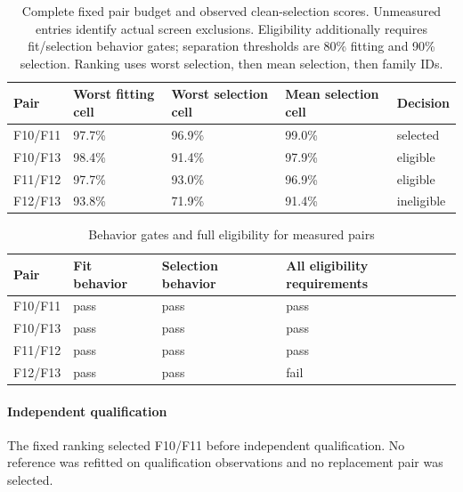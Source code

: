 \begin{table}[htbp]
\centering\footnotesize
\caption{Complete fixed pair budget and observed clean-selection scores. Unmeasured entries identify actual screen exclusions. Eligibility additionally requires fit/selection behavior gates; separation thresholds are 80\% fitting and 90\% selection. Ranking uses worst selection, then mean selection, then family IDs.}
\label{tab:b007-selection}
\begin{tabularx}{\linewidth}{@{}YYYYY@{}}
\toprule
Pair & Worst fitting cell & Worst selection cell & Mean selection cell & Decision \\
\midrule
F10/F11 & 97.7\% & 96.9\% & 99.0\% & selected \\
F10/F13 & 98.4\% & 91.4\% & 97.9\% & eligible \\
F11/F12 & 97.7\% & 93.0\% & 96.9\% & eligible \\
F12/F13 & 93.8\% & 71.9\% & 91.4\% & ineligible \\
\bottomrule
\end{tabularx}
\end{table}

\begin{table}[htbp]
\centering\footnotesize
\caption{Behavior gates and full eligibility for measured pairs}
\label{tab:b007-selection-gates}
\begin{tabularx}{\linewidth}{@{}YYYY@{}}
\toprule
Pair & Fit behavior & Selection behavior & All eligibility requirements \\
\midrule
F10/F11 & pass & pass & pass \\
F10/F13 & pass & pass & pass \\
F11/F12 & pass & pass & pass \\
F12/F13 & pass & pass & fail \\
\bottomrule
\end{tabularx}
\end{table}

\paragraph{Independent qualification}

The fixed ranking selected F10/F11 before independent qualification. No reference was refitted on qualification observations and no replacement pair was selected.

